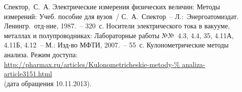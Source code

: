 \documentclass[pscyr]{hedwork}
\begin{document}
  \pagebreak
  \renewcommand{\bibname}{Список литературы}

  \begin{thebibliography}{9} 
     Спектор,~С.~А. Электрические измерения физических величин:
      Методы измерений: Учеб. пособие для вузов~/ С.~А.~Спектор~--
      Л.:~Энергоатомиздат. Ленингр.~отд-ние, 1987.~-- 320~с.
     Носители электрического тока в вакууме, металлах и
      полупроводниках: Лабораторные работы №№~4.3, 4.4, 35, 4.11А, 4.11Б,
      4.12~-- М.: Изд-во МФТИ, 2007.~-- 55~с.
     Кулонометрические методы анализа. Режим доступа:\\
      \url{http://pharmax.ru/articles/Kulonometricheskie-metody-%
      analiza-article3151.html}\\
      (дата обращения 10.11.2013).
  \end{thebibliography}
\end{document}
